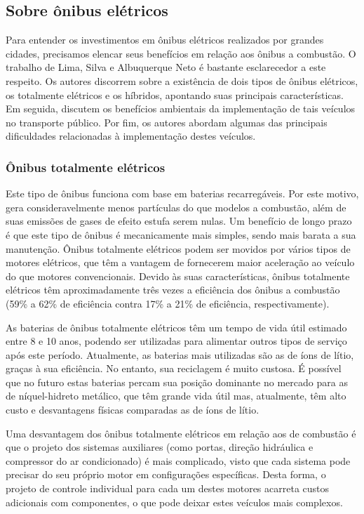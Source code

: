 \subsection{Sobre ônibus elétricos}\label{sec:impactos ambientais ônibus elétricos}
Para entender os investimentos em ônibus elétricos realizados por grandes cidades, precisamos elencar seus benefícios em relação aos ônibus a combustão. O trabalho de Lima, Silva e Albuquerque Neto \cite{LIMA:19} é bastante esclarecedor a este respeito. Os autores discorrem sobre a existência de dois tipos de ônibus elétricos, os totalmente elétricos e os híbridos, apontando suas principais características. Em seguida, discutem os benefícios ambientais da implementação de tais veículos no transporte público. Por fim, os autores abordam algumas das principais dificuldades relacionadas à implementação destes veículos.

\subsubsection*{Ônibus totalmente elétricos}
Este tipo de ônibus funciona com base em baterias recarregáveis. Por este motivo, gera consideravelmente menos partículas do que modelos a combustão, além de suas emissões de gases de efeito estufa serem nulas. Um benefício de longo prazo é que este tipo de ônibus é mecanicamente mais simples, sendo mais barata a sua manutenção. Ônibus totalmente elétricos podem ser movidos por vários tipos de motores elétricos, que têm a vantagem de fornecerem maior aceleração ao veículo do que motores convencionais. Devido às suas características, ônibus totalmente elétricos têm aproximadamente três vezes a eficiência dos ônibus a combustão (59\% a 62\% de eficiência contra 17\% a 21\% de eficiência, respectivamente).

As baterias de ônibus totalmente elétricos têm um tempo de vida útil estimado entre 8 e 10 anos, podendo ser utilizadas para alimentar outros tipos de serviço após este período. Atualmente, as baterias mais utilizadas são as de íons de lítio, graças à sua eficiência. No entanto, sua reciclagem é muito custosa. É possível que no futuro estas baterias percam sua posição dominante no mercado para as de níquel-hidreto metálico, que têm grande vida útil mas, atualmente, têm alto custo e desvantagens físicas comparadas as de íons de lítio.

Uma desvantagem dos ônibus totalmente elétricos em relação aos de combustão é que o projeto dos sistemas auxiliares (como portas, direção hidráulica e compressor do ar condicionado) é mais complicado, visto que cada sistema pode precisar do seu próprio motor em configurações específicas. Desta forma, o projeto de controle individual para cada um destes motores acarreta custos adicionais com componentes, o que pode deixar estes veículos mais complexos.

